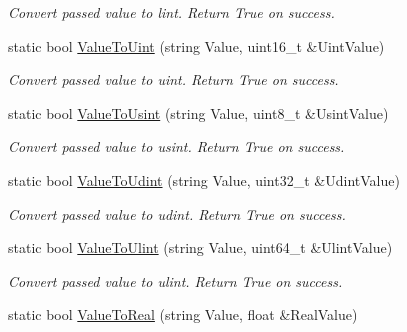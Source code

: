 \begin{DoxyCompactItemize}
\begin{DoxyCompactList}\small\item\em Convert passed value to lint. Return True on success. \end{DoxyCompactList}\item 
static bool \hyperlink{classpc__emulator_1_1DataTypeUtils_a1a3703bbf73bfb70e85f93d3a248935a}{Value\+To\+Uint} (string Value, uint16\+\_\+t \&Uint\+Value)\hypertarget{classpc__emulator_1_1DataTypeUtils_a1a3703bbf73bfb70e85f93d3a248935a}{}\label{classpc__emulator_1_1DataTypeUtils_a1a3703bbf73bfb70e85f93d3a248935a}

\begin{DoxyCompactList}\small\item\em Convert passed value to uint. Return True on success. \end{DoxyCompactList}\item 
static bool \hyperlink{classpc__emulator_1_1DataTypeUtils_a9d027e2add6a18b3868a6ba0e57144e8}{Value\+To\+Usint} (string Value, uint8\+\_\+t \&Usint\+Value)\hypertarget{classpc__emulator_1_1DataTypeUtils_a9d027e2add6a18b3868a6ba0e57144e8}{}\label{classpc__emulator_1_1DataTypeUtils_a9d027e2add6a18b3868a6ba0e57144e8}

\begin{DoxyCompactList}\small\item\em Convert passed value to usint. Return True on success. \end{DoxyCompactList}\item 
static bool \hyperlink{classpc__emulator_1_1DataTypeUtils_ad27a5f01c5ccd778bdcc8df9db37fb92}{Value\+To\+Udint} (string Value, uint32\+\_\+t \&Udint\+Value)\hypertarget{classpc__emulator_1_1DataTypeUtils_ad27a5f01c5ccd778bdcc8df9db37fb92}{}\label{classpc__emulator_1_1DataTypeUtils_ad27a5f01c5ccd778bdcc8df9db37fb92}

\begin{DoxyCompactList}\small\item\em Convert passed value to udint. Return True on success. \end{DoxyCompactList}\item 
static bool \hyperlink{classpc__emulator_1_1DataTypeUtils_a7b492f75dc7c8ef0d82466ac6fc14735}{Value\+To\+Ulint} (string Value, uint64\+\_\+t \&Ulint\+Value)\hypertarget{classpc__emulator_1_1DataTypeUtils_a7b492f75dc7c8ef0d82466ac6fc14735}{}\label{classpc__emulator_1_1DataTypeUtils_a7b492f75dc7c8ef0d82466ac6fc14735}

\begin{DoxyCompactList}\small\item\em Convert passed value to ulint. Return True on success. \end{DoxyCompactList}\item 
static bool \hyperlink{classpc__emulator_1_1DataTypeUtils_a44cf3e9125dbe71a5de57d5a7f06a5df}{Value\+To\+Real} (string Value, float \&Real\+Value)\hypertarget{classpc__emulator_1_1DataTypeUtils_a44cf3e9125dbe71a5de57d5a7f06a5df}{}\label{classpc__emulator_1_1DataTypeUtils_a44cf3e9125dbe71a5de57d5a7f06a5df}


\end{DoxyCompactItemize}
